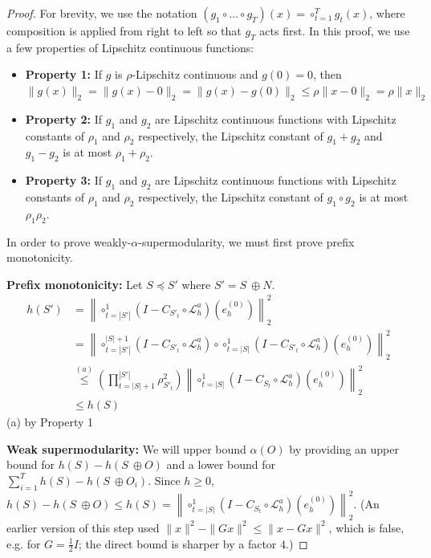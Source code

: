 \documentclass{article}
\newcommand{\edit}[1]{{\color{red}#1}}
\begin{document}
\begin{proof}
For brevity, we use the notation $\left(g_1 \circ \dots \circ g_T\right)(x) = \circ_{t = 1}^{T} g_t(x)$, where composition is applied from right to left so that $g_T$ acts first. In this proof, we use a few properties of Lipschitz continuous functions:
\begin{itemize}
    \item \textbf{Property 1:} If $g$ is $\rho$-Lipschitz continuous and $g(0) = 0$, then $\|g(x)\|_2 = \|g(x) - 0\|_2 = \|g(x) - g(0)\|_2 \leq \rho \|x - 0\|_2 = \rho\|x\|_2$
    \item \textbf{Property 2:} If $g_1$ and $g_2$ are Lipschitz continuous functions with Lipschitz constants of $\rho_1$ and $\rho_2$ respectively, the Lipschitz constant of $g_1 + g_2$ and $g_1 - g_2$ is \edit{at most} $\rho_1 + \rho_2$.
    \item \textbf{Property 3:} If $g_1$ and $g_2$ are Lipschitz continuous functions with Lipschitz constants of $\rho_1$ and $\rho_2$ respectively, the Lipschitz constant of $g_1 \circ g_2$ is \edit{at most} $\rho_1\rho_2$.
\end{itemize}

In order to prove weakly-$\alpha$-supermodularity, we must first prove prefix monotonicity.

\textbf{Prefix monotonicity: } Let $S \preceq S'$ where $S' = S \ \oplus N$.
\begin{align*}
    h(S') &= \left \|\circ_{t = |S'|}^1\left(I - C_{S'_t} \circ \mathcal{L}_h^a\right) \left(e^{(0)}_h\right)\right\|^2_2 \\
    &= \left \|\circ_{t = |S'|}^{|S| + 1}\left(I - C_{S'_t}  \circ \mathcal{L}_h^a\right)\circ \circ_{t = |S|}^1\left(I - C_{S'_t}  \circ \mathcal{L}_h^a\right) \left(e^{(0)}_h\right)\right\|^2_2 \\
    &\overset{(a)}{\leq}\left( \prod_{t = |S| + 1 }^{|S'|} \rho_{S'_t}^2 \right)\left\|\circ_{t = |S|}^1\left(I - C_{S_t} \circ \mathcal{L}_h^a\right) \left(e^{(0)}_h\right)\right\|^2_2 \\
    &\leq h(S)
\end{align*}
(a) by Property 1


\textbf{Weak supermodularity: } 
We will upper bound $\alpha(O)$ by providing an upper bound for $ h(S) - h(S\ \oplus O) $ and a lower bound for $\sum_{i = 1}^T h(S) - h(S\ \oplus O_i) $. 
\edit{Since $h \ge 0$, $h(S) - h(S\ \oplus O) \le h(S) = \left\| \circ_{t = |S|}^1\left(I - C_{S_t} \circ \mathcal{L}_h^a\right) \left(e^{(0)}_h\right)\right\|^2_2$. (An earlier version of this step used $\|x\|^2 - \|Gx\|^2 \le \|x - Gx\|^2$, which is false, e.g. for $G = \tfrac12 I$; the direct bound is sharper by a factor $4$.)}



\end{proof}
\end{document}
